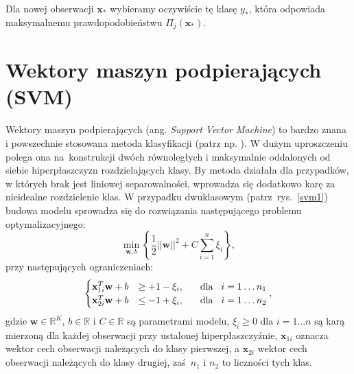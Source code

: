 \documentclass{mini}
\begin{document}
Dla nowej obserwacji $\mathbf{x}_{\ast}$ wybieramy oczywiście tę klasę $y_{\ast}$, która odpowiada maksymalnemu prawdopodobieństwu $\Pi_j(\mathbf{x}_{\ast})$.

\section{Wektory maszyn podpierających (SVM)}

Wektory maszyn podpierających (ang. \textit{Support Vector Machine}) to bardzo znana i powszechnie stosowana metoda klasyfikacji (patrz np. \cite{koronacki}). W dużym uproszczeniu polega ona na~konstrukcji dwóch równoległych i maksymalnie oddalonych od siebie hiperpłaszczyzn rozdzielających klasy. By metoda działała dla przypadków, w których brak jest liniowej separowalności, wprowadza się dodatkowo karę za nieidealne rozdzielenie klas. W przypadku dwuklasowym (patrz~rys.~\ref{svm1}) budowa modelu sprowadza się do rozwiązania następującego problemu optymalizacyjnego:
$$
\min_{\mathbf{w}, b}\left\lbrace\dfrac{1}{2}||\textbf{w}||^2+C\sum_{i=1}^{n}\xi_i\right\rbrace,
$$
przy następujących ograniczeniach:
$$
\begin{cases}
\mathbf{x}^T_{1i}\textbf{w}+b &\geq +1-\xi_i, \hspace{6mm} \text{dla}\hspace{3mm}i=1\ldots n_1 \\
\mathbf{x}^T_{2i}\textbf{w}+b &\leq -1+\xi_i, \hspace{6mm} \text{dla}\hspace{3mm}i=1\ldots n_2
\end{cases},
$$    
gdzie $\mathbf{w}\in\mathbb{R}^K$, $b\in\mathbb{R}$ i $C\in\mathbb{R}$ są parametrami modelu, $\xi_i\geq 0$ dla $i=1\ldots n$ są karą mierzoną dla każdej obserwacji przy ustalonej hiperpłaszczyźnie, $\mathbf{x}_{1i}$ oznacza wektor cech obserwacji należących do klasy pierwszej, a $\mathbf{x}_{2i}$ wektor cech obserwacji należących do klasy drugiej, zaś~$n_1$ i $n_2$ to liczności tych klas. 
\end{document}
